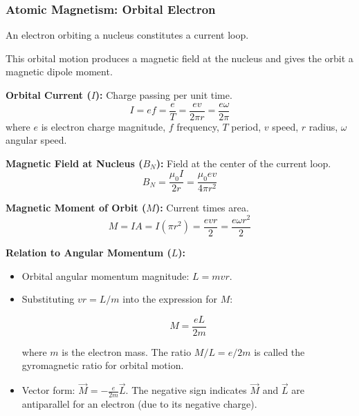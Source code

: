 \begin{frame}[t]
    \frametitle{\textcolor{deepnavy}{\textbf{Atomic Magnetism: Orbital Electron}}}
    \renewcommand{\familydefault}{\rmdefault}
    \small

      \item<+-> An electron orbiting a nucleus constitutes a current loop.
      \item<+-> This orbital motion produces a magnetic field at the nucleus and gives the orbit a magnetic dipole moment.

      \item<+-> \textbf{Orbital Current ($I$):} Charge passing per unit time.
        \begin{equation*} I = ef = \frac{e}{T} = \frac{ev}{2\pi r} = \frac{e\omega}{2\pi} \end{equation*}
          where $e$ is electron charge magnitude, $f$ frequency, $T$ period, $v$ speed, $r$ radius, $\omega$ angular speed.
      \item<+-> \textbf{Magnetic Field at Nucleus ($B_N$):} Field at the center of the current loop.
          \begin{equation*} B_N = \frac{\mu_0 I}{2r} = \frac{\mu_0 ev}{4\pi r^2} \end{equation*}
      \item<+-> \textbf{Magnetic Moment of Orbit ($M$):} Current times area.
          \begin{equation*} M = IA = I (\pi r^2) = \frac{evr}{2} = \frac{e\omega r^2}{2} \end{equation*}

      \item<+-> \textbf{Relation to Angular Momentum ($L$):}
        \begin{itemize}[<+->]
              \item Orbital angular momentum magnitude: $L = mvr$.
            \item Substituting $vr = L/m$ into the expression for $M$:
            \begin{tcolorbox}[colback=blue!5,colframe=blue!80,boxrule=0.5pt,arc=1mm,boxsep=1pt]
            \begin{equation*}
                 M = \frac{eL}{2m}
            \end{equation*}
              \end{tcolorbox}
            where $m$ is the electron mass. The ratio $M/L = e/2m$ is called the gyromagnetic ratio for orbital motion.
            \item Vector form: $\vec{M} = -\frac{e}{2m}\vec{L}$.   The negative sign indicates $\vec{M}$ and $\vec{L}$ are antiparallel for an electron (due to its negative charge).
        \end{itemize}
\end{frame}

